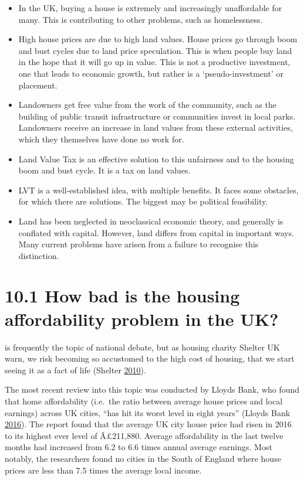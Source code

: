 \documentclass[]{tufte-handout}
\providecommand{\tightlist}{%
  \setlength{\itemsep}{0pt}\setlength{\parskip}{0pt}}
\begin{document}
\begin{itemize}
\tightlist
\item
  In the UK, buying a house is extremely and increasingly unaffordable
  for many. This is contributing to other problems, such as
  homelessness.
\item
  High house prices are due to high land values. House prices go through
  boom and bust cycles due to land price speculation. This is when
  people buy land in the hope that it will go up in value. This is not a
  productive investment, one that leads to economic growth, but rather
  is a `pseudo-investment' or placement.
\item
  Landowners get free value from the work of the community, such as the
  building of public transit infrastructure or communities invest in
  local parks. Landowners receive an increase in land values from these
  external activities, which they themselves have done no work for.
\item
  Land Value Tax is an effective solution to this unfairness and to the
  housing boom and bust cycle. It is a tax on land values.
\item
  LVT is a well-established idea, with multiple benefits. It faces some
  obstacles, for which there are solutions. The biggest may be political
  feasibility.
\item
  Land has been neglected in neoclassical economic theory, and generally
  is conflated with capital. However, land differs from capital in
  important ways. Many current problems have arisen from a failure to
  recognise this distinction.
\end{itemize}

\hypertarget{how-bad-is-the-housing-affordability-problem-in-the-uk}{%
\section{10.1 How bad is the housing affordability problem in the
UK?}\label{how-bad-is-the-housing-affordability-problem-in-the-uk}}

 is frequently the topic of
national debate, but as housing charity Shelter UK warn, we risk
becoming so accustomed to the high cost of housing, that we start seeing
it as a fact of life (Shelter
\protect\hyperlink{ref-Shelter2010}{2010}).

The most recent review into this topic was conducted by Lloyds Bank, who
found that home affordability (i.e.~the ratio between average house
prices and local earnings) across UK cities, ``has hit its worst level
in eight years'' (Lloyds Bank
\protect\hyperlink{ref-LloydsBank2016}{2016}). The report found that the
average UK city house price had risen in 2016 to its highest ever level
of Â£211,880. Average affordability in the last twelve months had
increased from 6.2 to 6.6 times annual average earnings. Most notably,
the researchers found no cities in the South of England where house
prices are less than 7.5 times the average local income.
\end{document}
